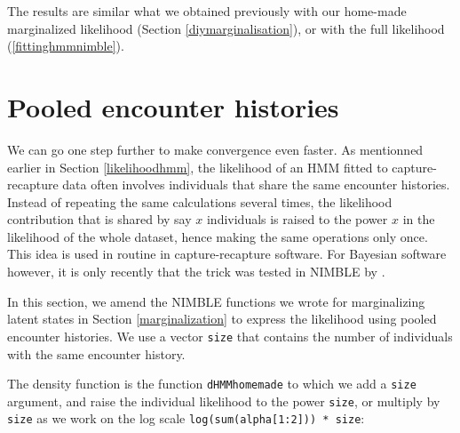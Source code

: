 \documentclass[
  12pt,
]{krantz}
\begin{document}
The results are similar what we obtained previously with our home-made marginalized likelihood (Section \ref{diymarginalisation}), or with the full likelihood (\ref{fittinghmmnimble}).

\section{Pooled encounter histories}\label{pooled-likelihood}

We can go one step further to make convergence even faster. As mentionned earlier in Section \ref{likelihoodhmm}, the likelihood of an HMM fitted to capture-recapture data often involves individuals that share the same encounter histories. Instead of repeating the same calculations several times, the likelihood contribution that is shared by say \(x\) individuals is raised to the power \(x\) in the likelihood of the whole dataset, hence making the same operations only once. This idea is used in routine in capture-recapture software. For Bayesian software however, it is only recently that the trick was tested in NIMBLE by \citet{TurekEtAl2016}.

In this section, we amend the NIMBLE functions we wrote for marginalizing latent states in Section \ref{marginalization} to express the likelihood using pooled encounter histories. We use a vector \texttt{size} that contains the number of individuals with the same encounter history.

The density function is the function \texttt{dHMMhomemade} to which we add a \texttt{size} argument, and raise the individual likelihood to the power \texttt{size}, or multiply by \texttt{size} as we work on the log scale \texttt{log(sum(alpha{[}1:2{]}))\ *\ size}:
\end{document}
